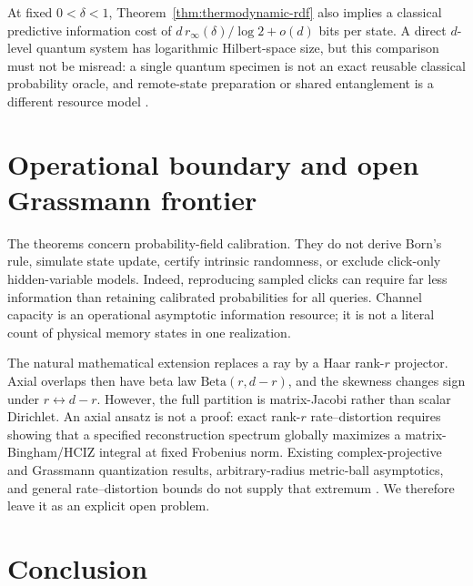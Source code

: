 \documentclass[11pt,a4paper]{article}
\theoremstyle{remark}
\begin{document}
At fixed $0<\delta<1$, Theorem~\ref{thm:thermodynamic-rdf} also implies a
classical predictive information cost of
$d\,r_\infty(\delta)/\log2+o(d)$ bits per state.  A direct $d$-level quantum
system has logarithmic Hilbert-space size, but this comparison must not be
misread: a single quantum specimen is not an exact reusable classical
probability oracle, and remote-state preparation or shared entanglement is a
different resource model \cite{BennettRemote2001,BennettEtAlRSP2005}.

\section{Operational boundary and open Grassmann frontier}

The theorems concern probability-field calibration.  They do not derive
Born's rule, simulate state update, certify intrinsic randomness, or exclude
click-only hidden-variable models.  Indeed, reproducing sampled clicks can
require far less information than retaining calibrated probabilities for all
queries.  Channel capacity is an operational asymptotic information resource;
it is not a literal count of physical memory states in one realization.

The natural mathematical extension replaces a ray by a Haar rank-$r$
projector.  Axial overlaps then have beta law $\mathrm{Beta}(r,d-r)$, and the
skewness changes sign under $r\leftrightarrow d-r$.  However, the full
partition is matrix-Jacobi rather than scalar Dirichlet.  An axial ansatz is
not a proof: exact rank-$r$ rate--distortion requires showing that a specified
reconstruction spectrum globally maximizes a matrix-Bingham/HCIZ integral at
fixed Frobenius norm.  Existing complex-projective and Grassmann quantization
results, arbitrary-radius metric-ball asymptotics, and general
rate--distortion bounds do not supply that extremum
\cite{MondalDuttaHeath2006,DaiLiuRider2008,PitavalEtAl2016,RieglerKolianderBolcskei2023}.
We therefore leave it as an explicit open problem.

\section{Conclusion}
\end{document}
